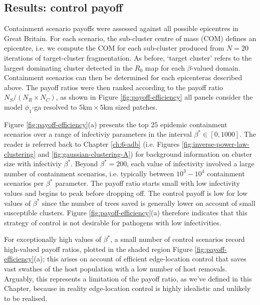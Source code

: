 \newpage

\subsection{Results: control payoff}

Containment scenario payoffs were assessed against all possible epicentres in Great Britain.
For each scenario, the sub-cluster centre of mass (COM) defines an epicentre, i.e. we compute the COM for each sub-cluster produced from $N=20$ iterations of target-cluster fragmentation. 
As before, `target cluster' refers to the largest dominating cluster detected in the $R_0$ map for each $\beta$-valued domain.
Containment scenarios can then be determined for each epicenter\textemdash as described above.
The payoff ratios were then ranked according to the payoff ratio $N_S/ (N_R\times N_C)$, as shown in Figure \ref{fig:payoff-efficiency}\textemdash 
all panels consider the model $\phi_1$-ga resolved to $\mathrm{5 km \times 5 km}$ sized patches.

Figure \ref{fig:payoff-efficiency}(a) presents the top $25$ epidemic containment scenarios over a range of infectiviy parameters in the interval $\beta^* \in [0, 1000]$. 
The reader is referred back to Chapter \ref{ch:6-adb} (i.e. Figures \ref{fig:inverse-power-law-clustering} and \ref{fig:gaussian-clustering-A}) for background information on cluster size with infectiviy $\beta^*$.
Beyond $\beta^*=200$, each value of infectivity involved a large number of containment scenarios, i.e. typically between $10^3-10^4$ containment scenarios per $\beta^*$ parameter.
The payoff ratio starts small with low infectivity values and begins to peak before dropping off. 
The control payoff is low for low values of $\beta^*$ since the number of trees saved is generally lower on account of small susceptible clusters.
Figure \ref{fig:payoff-efficiency}(a) therefore indicates that this strategy of control is not desirable for pathogens with low infectivities.

For exceptionally high values of $\beta^*$, a small number of control scenarios record high-valued payoff ratios, plotted in the shaded region Figure \ref{fig:payoff-efficiency}(a);
this arises on account of efficient edge-location control that saves vast swathes of the host population with a low number of host removals.
Arguably, this represents a limitation of the payoff ratio, as we've defined in this Chapter, because in reality edge-location control is highly idealistic and unlikely to be realised.

